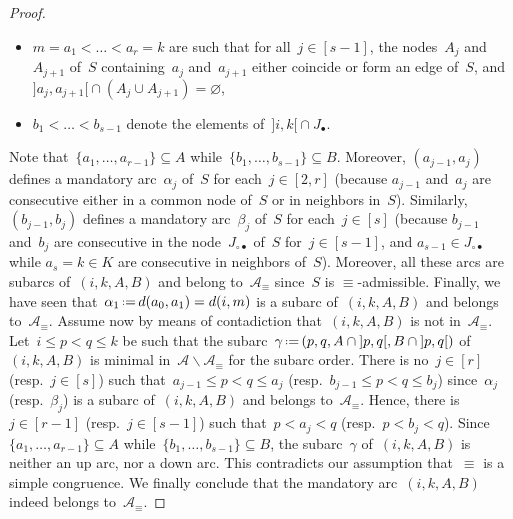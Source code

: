 \documentclass{amsart}
\theoremstyle{definition}
\newcommand{\ssm}{\smallsetminus} %
\newcommand{\eqdef}{\mbox{\,\raisebox{0.2ex}{\scriptsize\ensuremath{\mathrm:}}\ensuremath{=}\,}} %
\newcommand{\arcs}{{\mathcal{A}}} %
\begin{document}
\begin{proof}
\begin{itemize}
\item $m = a_1 < \dots < a_r = k$ are such that for all~$j \in [s-1]$, the nodes~$A_j$ and~$A_{j+1}$ of~$S$ containing~$a_j$ and~$a_{j+1}$ either coincide or form an edge of~$S$, and~${{]a_j, a_{j+1}[} \cap (A_j \cup A_{j+1}) = \varnothing}$,
\item $b_1 < \dots < b_{s-1}$ denote the elements of~${]i,k[} \cap J_\bullet$.
\end{itemize}
Note that~$\{a_1, \dots, a_{r-1}\} \subseteq A$ while~$\{b_1, \dots, b_{s-1}\} \subseteq B$.
Moreover, $(a_{j-1}, a_j)$ defines a mandatory arc~$\alpha_j$ of~$S$ for each~$j \in [2,r]$ (because $a_{j-1}$ and~$a_j$ are consecutive either in a common node of~$S$ or in neighbors in~$S$).
Similarly, $(b_{j-1}, b_j)$ defines a mandatory arc~$\beta_j$ of~$S$ for each~$j \in [s]$ (because $b_{j-1}$ and~$b_j$ are consecutive in the node~$J_{\circ\bullet}$ of~$S$ for~$j \in [s-1]$, and $a_{s-1} \in J_{\circ\bullet}$ while $a_s = k \in K$ are consecutive in neighbors of~$S$).
Moreover, all these arcs are subarcs of~$(i,k,A,B)$ and belong to~$\arcs_\equiv$ since~$S$ is $\equiv$-admissible.
Finally, we have seen that~$\alpha_1 \eqdef d(a_0,a_1) = d(i,m)$ is a subarc of~$(i,k,A,B)$ and belongs to~$\arcs_\equiv$.
Assume now by means of contadiction that~$(i,k,A,B)$ is not in~$\arcs_\equiv$.
Let~$i \le p < q \le k$ be such that the subarc~$\gamma \eqdef (p, q, A \cap {]p,q[}, B \cap {]p,q[})$ of~$(i,k,A,B)$ is minimal in~$\arcs \ssm \arcs_\equiv$ for the subarc order.
There is no~$j \in [r]$ (resp.~$j \in [s]$) such that~${a_{j-1} \le p < q \le a_j}$ (resp.~$b_{j-1} \le p < q \le b_j$) since~$\alpha_j$ (resp.~$\beta_j$) is a subarc of~$(i,k,A,B)$ and belongs to~$\arcs_\equiv$.
Hence, there is~$j \in [r-1]$ (resp.~$j \in [s-1]$) such that~$p < a_j < q$ (resp.~$p < b_j < q$).
Since~$\{a_1, \dots, a_{r-1}\} \subseteq A$ while~$\{b_1, \dots, b_{s-1}\} \subseteq B$, the subarc~$\gamma$ of~$(i,k,A,B)$ is neither an up arc, nor a down arc.
This contradicts our assumption that~$\equiv$ is a simple congruence.
We finally conclude that the mandatory arc~$(i,k,A,B)$ indeed belongs to~$\arcs_\equiv$.


\end{proof}
\end{document}
